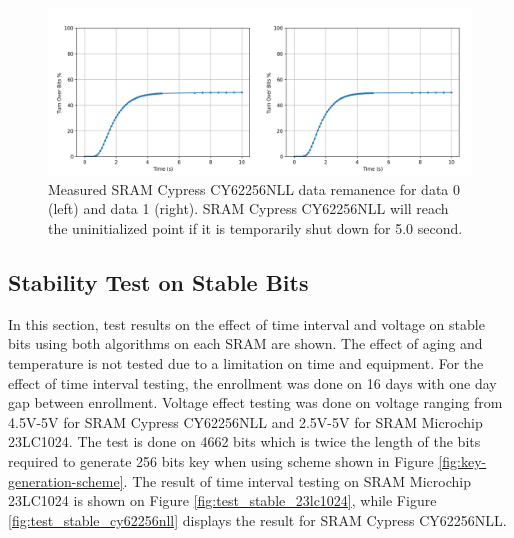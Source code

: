 \begin{figure}[tph!]
    \centerline{\includegraphics[width={\textwidth}]{images/remanence_cy62256nll}}
    \caption{Measured SRAM Cypress CY62256NLL data remanence for data 0 (left) and data 1 (right).
    SRAM Cypress CY62256NLL will reach the uninitialized point if it is temporarily shut down for 5.0 second.}
    \label{fig:CY62256NLL-remanence0}
\end{figure}


\subsection{Stability Test on Stable Bits}\label{ch:hd_intra_stable}
In this section, test results on the effect of time interval and voltage on stable bits using both algorithms on each SRAM are shown. The effect of aging and temperature is not tested due to a limitation on time and equipment. For the effect of time interval testing, the enrollment was done on 16 days with one day gap between enrollment. Voltage effect testing was done on voltage ranging from 4.5V-5V for SRAM Cypress CY62256NLL and 2.5V-5V for SRAM Microchip 23LC1024. The test is done on 4662 bits which is twice the length of the bits required to generate 256 bits key when using scheme shown in Figure \ref{fig:key-generation-scheme}. The result of time interval testing on SRAM Microchip 23LC1024 is shown on Figure \ref{fig:test_stable_23lc1024}, while Figure \ref{fig:test_stable_cy62256nll} displays the result for SRAM Cypress CY62256NLL.

